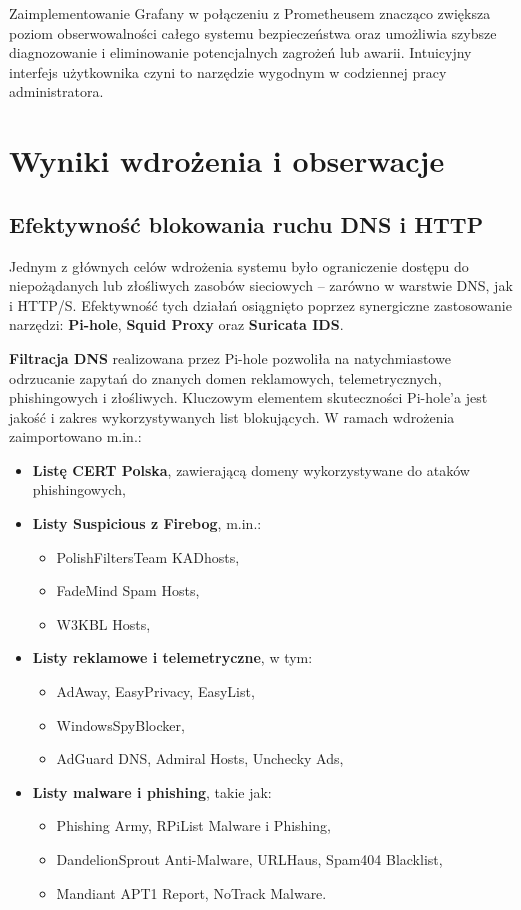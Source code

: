 \documentclass[
    left=2.5cm,         %
    right=2.5cm,        %
    top=2.5cm,          %
    bottom=3cm,         %
    bindingoffset=6mm,  %
    nohyphenation=true %
]{eiti/eiti-thesis} %
\begin{document}
Zaimplementowanie Grafany w połączeniu z Prometheusem znacząco zwiększa poziom obserwowalności całego systemu bezpieczeństwa oraz umożliwia szybsze diagnozowanie i eliminowanie potencjalnych zagrożeń lub awarii. Intuicyjny interfejs użytkownika czyni to narzędzie wygodnym w codziennej pracy administratora.


\section{ Wyniki wdrożenia i obserwacje}
\subsection{Efektywność blokowania ruchu DNS i HTTP}

Jednym z głównych celów wdrożenia systemu było ograniczenie dostępu do niepożądanych lub złośliwych zasobów sieciowych – zarówno w warstwie DNS, jak i HTTP/S. Efektywność tych działań osiągnięto poprzez synergiczne zastosowanie narzędzi: \textbf{Pi-hole}, \textbf{Squid Proxy} oraz \textbf{Suricata IDS}.

\textbf{Filtracja DNS} realizowana przez Pi-hole pozwoliła na natychmiastowe odrzucanie zapytań do znanych domen reklamowych, telemetrycznych, phishingowych i złośliwych. Kluczowym elementem skuteczności Pi-hole’a jest jakość i zakres wykorzystywanych list blokujących. W ramach wdrożenia zaimportowano m.in.:
\begin{itemize}
    \item \textbf{Listę CERT Polska}\cite{cert_pl}, zawierającą domeny wykorzystywane do ataków phishingowych\cite{certpl-domains},
    \item \textbf{Listy Suspicious z Firebog\cite{firebog}}, m.in.:
    \begin{itemize}
        \item PolishFiltersTeam KADhosts,
        \item FadeMind Spam Hosts,
        \item W3KBL Hosts,
    \end{itemize}
    \item \textbf{Listy reklamowe i telemetryczne}, w tym:
    \begin{itemize}
        \item AdAway, EasyPrivacy, EasyList,
        \item WindowsSpyBlocker,
        \item AdGuard DNS, Admiral Hosts, Unchecky Ads,
    \end{itemize}
    \item \textbf{Listy malware i phishing}, takie jak:
    \begin{itemize}
        \item Phishing Army, RPiList Malware i Phishing,
        \item DandelionSprout Anti-Malware, URLHaus, Spam404 Blacklist,
        \item Mandiant APT1 Report, NoTrack Malware.
    \end{itemize}
\end{itemize}
\end{document}
